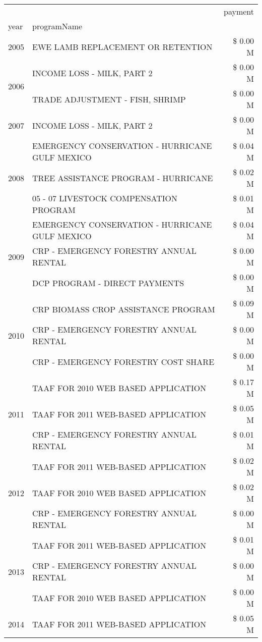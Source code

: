\begin{tabular}{llr}
\toprule
 &  & payment \\
year & programName &  \\
\midrule
2005 & EWE LAMB REPLACEMENT OR RETENTION & \$ 0.00 M \\
\cline{1-3}
\multirow[t]{2}{*}{2006} & INCOME LOSS - MILK, PART 2 & \$ 0.00 M \\
 & TRADE ADJUSTMENT - FISH, SHRIMP & \$ 0.00 M \\
\cline{1-3}
2007 & INCOME LOSS - MILK, PART 2 & \$ 0.00 M \\
\cline{1-3}
\multirow[t]{3}{*}{2008} & EMERGENCY CONSERVATION - HURRICANE GULF MEXICO & \$ 0.04 M \\
 & TREE ASSISTANCE PROGRAM - HURRICANE & \$ 0.02 M \\
 & 05 - 07 LIVESTOCK COMPENSATION PROGRAM & \$ 0.01 M \\
\cline{1-3}
\multirow[t]{3}{*}{2009} & EMERGENCY CONSERVATION - HURRICANE GULF MEXICO & \$ 0.04 M \\
 & CRP - EMERGENCY FORESTRY ANNUAL RENTAL & \$ 0.00 M \\
 & DCP PROGRAM - DIRECT PAYMENTS & \$ 0.00 M \\
\cline{1-3}
\multirow[t]{3}{*}{2010} & CRP BIOMASS CROP ASSISTANCE PROGRAM & \$ 0.09 M \\
 & CRP - EMERGENCY FORESTRY ANNUAL RENTAL & \$ 0.00 M \\
 & CRP - EMERGENCY FORESTRY COST SHARE & \$ 0.00 M \\
\cline{1-3}
\multirow[t]{3}{*}{2011} & TAAF FOR 2010 WEB BASED APPLICATION & \$ 0.17 M \\
 & TAAF FOR 2011 WEB-BASED APPLICATION & \$ 0.05 M \\
 & CRP - EMERGENCY FORESTRY ANNUAL RENTAL & \$ 0.01 M \\
\cline{1-3}
\multirow[t]{3}{*}{2012} & TAAF FOR 2011 WEB-BASED APPLICATION & \$ 0.02 M \\
 & TAAF FOR 2010 WEB BASED APPLICATION & \$ 0.02 M \\
 & CRP - EMERGENCY FORESTRY ANNUAL RENTAL & \$ 0.00 M \\
\cline{1-3}
\multirow[t]{3}{*}{2013} & TAAF FOR 2011 WEB-BASED APPLICATION & \$ 0.01 M \\
 & CRP - EMERGENCY FORESTRY ANNUAL RENTAL & \$ 0.00 M \\
 & TAAF FOR 2010 WEB BASED APPLICATION & \$ 0.00 M \\
\cline{1-3}
\multirow[t]{3}{*}{2014} & TAAF FOR 2011 WEB-BASED APPLICATION & \$ 0.05 M \\

\end{tabular}
